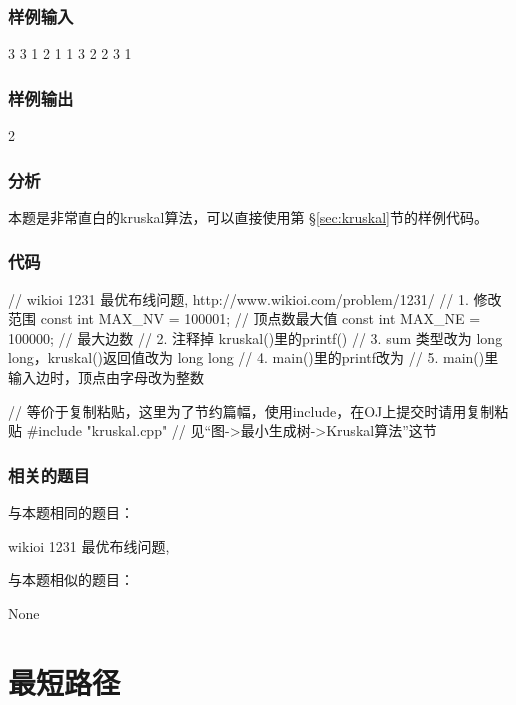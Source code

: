 \subsubsection{样例输入}
\begin{Code}
3 3
1 2 1
1 3 2
2 3 1
\end{Code}

\subsubsection{样例输出}
\begin{Code}
2
\end{Code}

\subsubsection{分析}
本题是非常直白的kruskal算法，可以直接使用第 \S \ref{sec:kruskal}节的样例代码。

\subsubsection{代码}
\begin{Codex}[label=wiring.c]
// wikioi 1231 最优布线问题, http://www.wikioi.com/problem/1231/
// 1. 修改范围
const int MAX_NV = 100001; // 顶点数最大值
const int MAX_NE = 100000;  // 最大边数
// 2. 注释掉 kruskal()里的printf()
// 3. sum 类型改为 long long，kruskal()返回值改为 long long
// 4. main()里的printf改为 %
// 5. main()里输入边时，顶点由字母改为整数

// 等价于复制粘贴，这里为了节约篇幅，使用include，在OJ上提交时请用复制粘贴
#include "kruskal.cpp"  // 见“图->最小生成树->Kruskal算法”这节
\end{Codex}

\subsubsection{相关的题目}
与本题相同的题目：
\begindot
\item wikioi 1231 最优布线问题, 
\myenddot

与本题相似的题目：
\begindot
\item None
\myenddot


\section{最短路径} %

